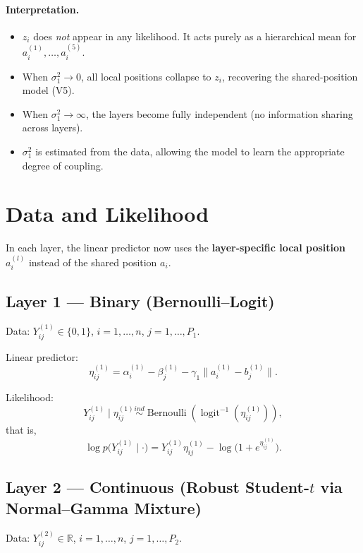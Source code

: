 \documentclass[11pt]{article}
\begin{document}
\paragraph{Interpretation.}
\begin{itemize}[leftmargin=1.5em]
    \item $z_i$ does \emph{not} appear in any likelihood. It acts purely as a hierarchical mean for $a_i^{(1)},\dots,a_i^{(5)}$.
    \item When $\sigma_1^2 \to 0$, all local positions collapse to $z_i$, recovering the shared-position model (V5).
    \item When $\sigma_1^2 \to \infty$, the layers become fully independent (no information sharing across layers).
    \item $\sigma_1^2$ is estimated from the data, allowing the model to learn the appropriate degree of coupling.
\end{itemize}

\section{Data and Likelihood}

In each layer, the linear predictor now uses the \textbf{layer-specific local position} $a_i^{(l)}$ instead of the shared position $a_i$.

\subsection{Layer 1 --- Binary (Bernoulli--Logit)}

Data: $Y_{ij}^{(1)} \in \{0,1\}$, $i=1,\dots,n$, $j=1,\dots,P_1$.

Linear predictor:
\[
\eta_{ij}^{(1)} = \alpha_i^{(1)} - \beta_j^{(1)} - \gamma_1\|a_i^{(1)} - b_j^{(1)}\|.
\]

Likelihood:
\[
Y_{ij}^{(1)} \mid \eta_{ij}^{(1)} \overset{ind}{\sim} \operatorname{Bernoulli}\!\left(\operatorname{logit}^{-1}(\eta_{ij}^{(1)})\right),
\]
that is,
\[
\log p\bigl(Y_{ij}^{(1)}\mid \cdot\bigr) = Y_{ij}^{(1)}\eta_{ij}^{(1)} - \log\bigl(1+e^{\eta_{ij}^{(1)}}\bigr).
\]

\subsection{Layer 2 --- Continuous (Robust Student-$t$ via Normal--Gamma Mixture)}

Data: $Y_{ij}^{(2)} \in \mathbb{R}$, $i=1,\dots,n$, $j=1,\dots,P_2$.
\end{document}
